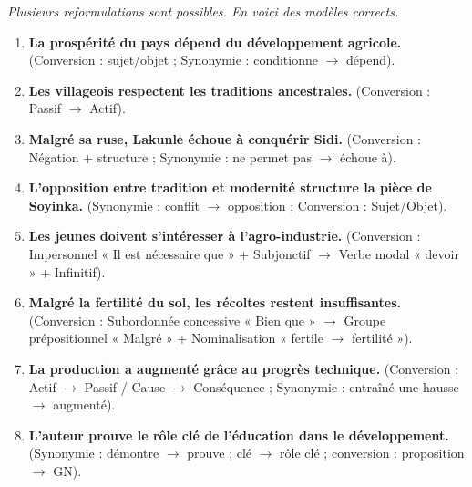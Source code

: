 \documentclass[11pt]{article}
\begin{document}
\begin{corrige}
\textit{Plusieurs reformulations sont possibles. En voici des modèles corrects.}
\begin{enumerate}
    \item \textbf{La prospérité du pays dépend du développement agricole.} (Conversion : sujet/objet ; Synonymie : conditionne $\to$ dépend).
    \item \textbf{Les villageois respectent les traditions ancestrales.} (Conversion : Passif $\to$ Actif).
    \item \textbf{Malgré sa ruse, Lakunle échoue à conquérir Sidi.} (Conversion : Négation + structure ; Synonymie : ne permet pas $\to$ échoue à).
    \item \textbf{L'opposition entre tradition et modernité structure la pièce de Soyinka.} (Synonymie : conflit $\to$ opposition ; Conversion : Sujet/Objet).
    \item \textbf{Les jeunes doivent s'intéresser à l'agro-industrie.} (Conversion : Impersonnel « Il est nécessaire que » + Subjonctif $\to$ Verbe modal « devoir » + Infinitif).
    \item \textbf{Malgré la fertilité du sol, les récoltes restent insuffisantes.} (Conversion : Subordonnée concessive « Bien que » $\to$ Groupe prépositionnel « Malgré » + Nominalisation « fertile $\to$ fertilité »).
    \item \textbf{La production a augmenté grâce au progrès technique.} (Conversion : Actif $\to$ Passif / Cause $\to$ Conséquence ; Synonymie : entraîné une hausse $\to$ augmenté).
    \item \textbf{L'auteur prouve le rôle clé de l'éducation dans le développement.} (Synonymie : démontre $\to$ prouve ; clé $\to$ rôle clé ; conversion : proposition $\to$ GN).
\end{enumerate}
\end{corrige}
\end{document}
